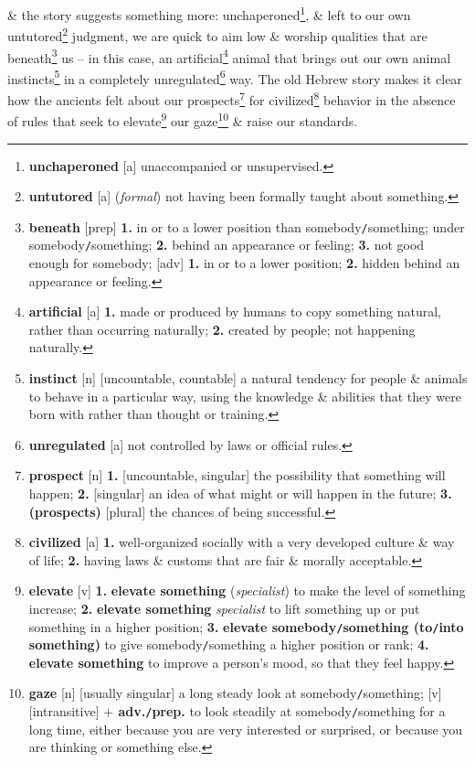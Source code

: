 \documentclass[oneside]{book}
\numberwithin{equation}{section}
\begin{document}
\& the story suggests something more: unchaperoned\footnote{\textbf{unchaperoned} [a] unaccompanied or unsupervised.}, \& left to our own untutored\footnote{\textbf{untutored} [a] (\textit{formal}) not having been formally taught about something.} judgment, we are quick to aim low \& worship qualities that are beneath\footnote{\textbf{beneath} [prep] \textbf{1.} in or to a lower position than somebody\texttt{/}something; under somebody\texttt{/}something; \textbf{2.} behind an appearance or feeling; \textbf{3.} not good enough for somebody; [adv] \textbf{1.} in or to a lower position; \textbf{2.} hidden behind an appearance or feeling.} us -- in this case, an artificial\footnote{\textbf{artificial} [a] \textbf{1.} made or produced by humans to copy something natural, rather than occurring naturally; \textbf{2.} created by people; not happening naturally.} animal that brings out our own animal instincts\footnote{\textbf{instinct} [n] [uncountable, countable] a natural tendency for people \& animals to behave in a particular way, using the knowledge \& abilities that they were born with rather than thought or training.} in a completely unregulated\footnote{\textbf{unregulated} [a] not controlled by laws or official rules.} way. The old Hebrew story makes it clear how the ancients felt about our prospects\footnote{\textbf{prospect} [n] \textbf{1.} [uncountable, singular] the possibility that something will happen; \textbf{2.} [singular] an idea of what might or will happen in the future; \textbf{3.} \textbf{(prospects)} [plural] the chances of being successful.} for civilized\footnote{\textbf{civilized} [a] \textbf{1.} well-organized socially with a very developed culture \& way of life; \textbf{2.} having laws \& customs that are fair \& morally acceptable.} behavior in the absence of rules that seek to elevate\footnote{\textbf{elevate} [v] \textbf{1.} \textbf{elevate something} (\textit{specialist}) to make the level of something increase; \textbf{2.} \textbf{elevate something} \textit{specialist} to lift something up or put something in a higher position; \textbf{3.} \textbf{elevate somebody\texttt{/}something (to\texttt{/}into something)} to give somebody\texttt{/}something a higher position or rank; \textbf{4.} \textbf{elevate something} to improve a person's mood, so  that they feel happy.} our gaze\footnote{\textbf{gaze} [n] [usually singular] a long steady look at somebody\texttt{/}something; [v] [intransitive] \textbf{$+$ adv.\texttt{/}prep.} to look steadily at somebody\texttt{/}something for a long time, either because you are very interested or surprised, or because you are thinking or something else.} \& raise our standards.
\end{document}
